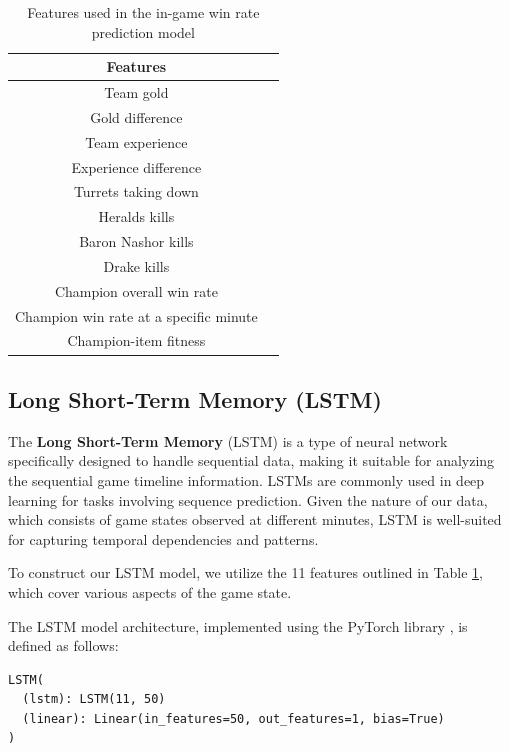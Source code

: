 \documentclass[11pt,a4paper,oneside]{report}
\begin{document}
\begin{table}[htbp]
  \centering
  \caption{Features used in the in-game win rate prediction model}
  \label{tab:lstm_features}
  \begin{tabular}{cc}
    \hline
    \textbf{Features}                      \\
    \hline
    Team gold                              \\
    Gold difference                        \\
    Team experience                        \\
    Experience difference                  \\
    Turrets taking down                    \\
    Heralds kills                          \\
    Baron Nashor kills                     \\
    Drake kills                            \\
    Champion overall win rate              \\
    Champion win rate at a specific minute \\
    Champion-item fitness                  \\
  \end{tabular}
\end{table}

\subsection{Long Short-Term Memory (LSTM)}

The \textbf{Long Short-Term Memory} (LSTM) is a type of neural network specifically designed to handle sequential data, making it suitable for analyzing the sequential game timeline information. LSTMs are commonly used in deep learning for tasks involving sequence prediction. Given the nature of our data, which consists of game states observed at different minutes, LSTM is well-suited for capturing temporal dependencies and patterns.

To construct our LSTM model, we utilize the 11 features outlined in Table \ref{tab:lstm_features}, which cover various aspects of the game state.

The LSTM model architecture, implemented using the PyTorch library \cite{pytorch-lstm}, is defined as follows:

\begin{verbatim}
LSTM(
  (lstm): LSTM(11, 50)
  (linear): Linear(in_features=50, out_features=1, bias=True)
)
\end{verbatim}
\end{document}
